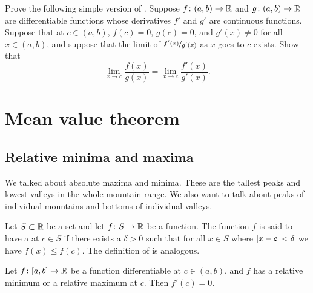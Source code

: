 \begin{exercise} \label{exercise:simpleLHopital}
Prove the following simple version of .
Suppose 
$f \colon (a,b) \to {\mathbb{R}}$ and $g \colon (a,b) \to {\mathbb{R}}$ are differentiable
functions
whose derivatives $f'$ and $g'$ are continuous functions.
Suppose that at $c \in (a,b)$, $f(c) = 0$, $g(c)=0$,
and
$g'(x) \not= 0$ for all $x \in (a,b)$, and suppose
that the limit of $\nicefrac{f'(x)}{g'(x)}$ as $x$ goes to $c$ exists.  Show that
\begin{equation*}
\lim_{x \to c} \frac{f(x)}{g(x)} = 
\lim_{x \to c} \frac{f'(x)}{g'(x)} .
\end{equation*}
\end{exercise}


\sectionnewpage
\section{Mean value theorem}
\label{sec:mvt}


\subsection{Relative minima and maxima}

We talked about absolute maxima and minima.  These are the tallest peaks and
lowest valleys in the whole mountain range.  We also want to talk
about peaks of individual mountains and bottoms of individual valleys.

\begin{defn}
Let $S \subset {\mathbb{R}}$ be a set and
let $f \colon S \to {\mathbb{R}}$ be a function.  The function $f$ is said to have
a \emph{}
at $c \in S$ if there exists a $\delta>0$
such that for all $x \in S$ where $\left\lvert {x-c} \right\rvert < \delta$
we have $f(x) \leq f(c)$.
The definition of
\emph{}
is analogous.
\end{defn}

\begin{lemma}\label{relminmax:lemma}
Let $f \colon [a,b] \to {\mathbb{R}}$ be a function differentiable at $c \in (a,b)$,
and $f$ has
a relative minimum or a relative maximum at $c$.  Then
$f'(c) = 0$.
\end{lemma}

